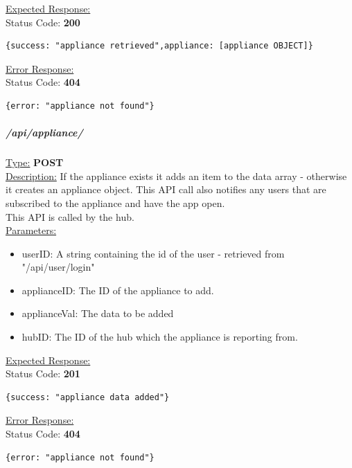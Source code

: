 \documentclass[draft,preprint,12pt,3p]{elsarticle}
\newcommand{\forceindent}{\leavevmode{\parindent=1em\indent}}
\begin{document}
\underline{Expected Response:}\\[5pt]
\forceindent Status Code: \textbf{200} \\
\begin{verbatim}
{success: "appliance retrieved",appliance: [appliance OBJECT]}
\end{verbatim}
\underline{Error Response:}\\[5pt]
\forceindent Status Code: \textbf{404} \\
\begin{verbatim}
{error: "appliance not found"}
\end{verbatim}

\subparagraph*{/api/appliance/}
\underline{Type:} \textbf{POST}\\

\underline{Description:} If the appliance exists it adds an item to the data array - otherwise it creates an appliance object. This API call also notifies any users that are subscribed to the appliance and have the app open.\\
This API is called by the hub.\\

\underline{Parameters:}
\begin{itemize}
\item userID: A string containing the id of the user - retrieved from "/api/user/login"

\item applianceID: The ID of the appliance to add.

\item applianceVal: The data to be added

\item hubID: The ID of the hub which the appliance is reporting from.

\end{itemize}

\underline{Expected Response:}\\[5pt]
\forceindent Status Code: \textbf{201} \\
\begin{verbatim}
{success: "appliance data added"}
\end{verbatim}
\underline{Error Response:}\\[5pt]
\forceindent Status Code: \textbf{404} \\
\begin{verbatim}
{error: "appliance not found"}
\end{verbatim}
\end{document}
